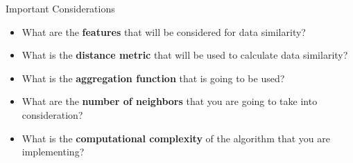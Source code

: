 \documentclass[usenames,dvipsnames]{beamer}
\begin{document}
\begin{frame}{Important Considerations}
\begin{itemize}
\item<1-> What are the \textbf{features} that will be considered for data similarity?
\item<2-> What is the \textbf{distance metric} that will be used to calculate data similarity?
\item<3-> What is the \textbf{aggregation function} that is going to be used?
\item<4-> What are the \textbf{number of neighbors} that you are going to take into consideration?
\item<5-> What is the \textbf{computational complexity} of the algorithm that you are implementing?
\end{itemize}
\end{frame}
\end{document}
